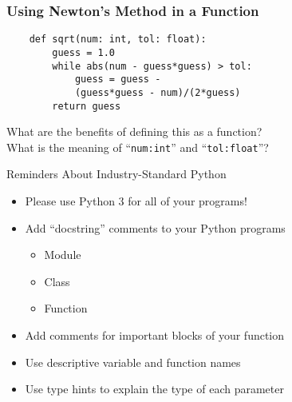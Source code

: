 \documentclass[14pt,aspectratio=169]{beamer}
\begin{document}
%
\begin{frame}[fragile]
  \frametitle{Using Newton's Method in a Function}
  \hspace*{-.8in}
  \begin{minipage}{6in}
    \begin{verbatim}
    def sqrt(num: int, tol: float):
        guess = 1.0
        while abs(num - guess*guess) > tol:
            guess = guess -
            (guess*guess - num)/(2*guess)
        return guess
    \end{verbatim}
  \end{minipage}
  \vspace*{.05in}
  \begin{center}
    \normalsize \noindent What are the benefits of defining this as a function? \\
    \normalsize \noindent What is the meaning of ``{\tt num:int}'' and ``{\tt tol:float}''? \\
  \end{center}
\end{frame}

%
\begin{frame}{Reminders About Industry-Standard Python}
  \begin{itemize}
    \item Please use Python 3 for all of your programs!
      \vspace*{-.15in}
    \item Add ``docstring'' comments to your Python programs
      \begin{itemize}
        \item Module
        \item Class
        \item Function
      \end{itemize}
      \vspace*{-.2in}
    \item Add comments for important blocks of your function
      \vspace*{-.2in}
    \item Use descriptive variable and function names
      \vspace*{-.2in}
    \item Use type hints to explain the type of each parameter
  \end{itemize}
\end{frame}
\end{document}
